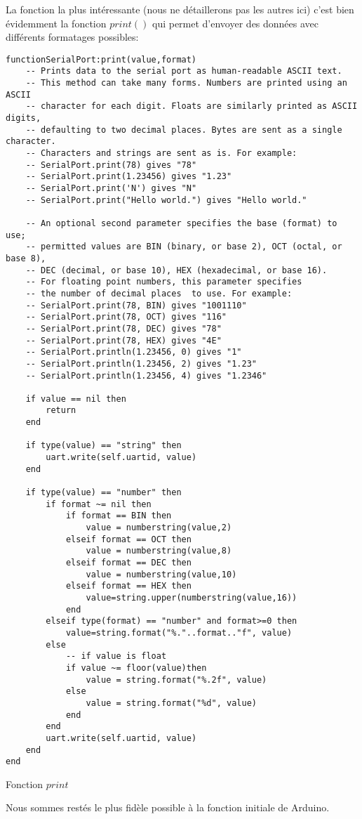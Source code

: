 La fonction la plus intéressante (nous ne détaillerons pas les autres ici) c’est bien évidemment la fonction $print()$ 
qui permet d’envoyer des données avec différents formatages possibles:
\newpage
\begin{table}[h!]
\begin{lstlisting}
functionSerialPort:print(value,format)
    -- Prints data to the serial port as human-readable ASCII text.
    -- This method can take many forms. Numbers are printed using an ASCII
    -- character for each digit. Floats are similarly printed as ASCII digits,
    -- defaulting to two decimal places. Bytes are sent as a single character.
    -- Characters and strings are sent as is. For example:
    -- SerialPort.print(78) gives "78"
    -- SerialPort.print(1.23456) gives "1.23"
    -- SerialPort.print('N') gives "N"
    -- SerialPort.print("Hello world.") gives "Hello world."

    -- An optional second parameter specifies the base (format) to use;
    -- permitted values are BIN (binary, or base 2), OCT (octal, or base 8),
    -- DEC (decimal, or base 10), HEX (hexadecimal, or base 16). 
    -- For floating point numbers, this parameter specifies
    -- the number of decimal places  to use. For example:
    -- SerialPort.print(78, BIN) gives "1001110"
    -- SerialPort.print(78, OCT) gives "116"
    -- SerialPort.print(78, DEC) gives "78"
    -- SerialPort.print(78, HEX) gives "4E"
    -- SerialPort.println(1.23456, 0) gives "1"
    -- SerialPort.println(1.23456, 2) gives "1.23"
    -- SerialPort.println(1.23456, 4) gives "1.2346"

    if value == nil then
        return
    end

    if type(value) == "string" then
        uart.write(self.uartid, value)
    end

    if type(value) == "number" then
        if format ~= nil then
            if format == BIN then
                value = numberstring(value,2)
            elseif format == OCT then
                value = numberstring(value,8)
            elseif format == DEC then
                value = numberstring(value,10)
            elseif format == HEX then
                value=string.upper(numberstring(value,16))
            end
        elseif type(format) == "number" and format>=0 then
            value=string.format("%."..format.."f", value)
        else
            -- if value is float
            if value ~= floor(value)then
                value = string.format("%.2f", value)
            else
                value = string.format("%d", value)
            end
        end
        uart.write(self.uartid, value)
    end
end
\end{lstlisting}
\caption{Fonction $print$}
\end{table}
\newpage
Nous sommes restés le plus fidèle possible à la fonction initiale de Arduino.



